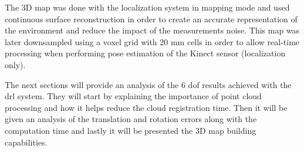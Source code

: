 The 3D map was done with the localization system in mapping mode and used continuous surface reconstruction in order to create an accurate representation of the environment and reduce the impact of the measurements noise. This map was later downsampled using a voxel grid with 20 mm cells in order to allow real-time processing when performing pose estimation of the Kinect sensor (localization only).

The next sections will provide an analysis of the 6 \gls{dof} results achieved with the \gls{drl} system. They will start by explaining the importance of point cloud processing and how it helps reduce the cloud registration time. Then it will be given an analysis of the translation and rotation errors along with the computation time and lastly it will be presented the 3D map building capabilities.


